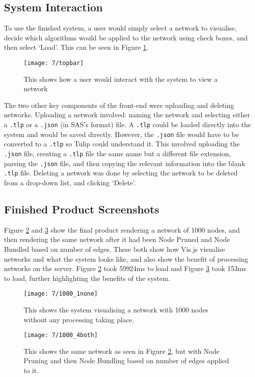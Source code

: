 \documentclass[../dissertation.tex]{subfiles}
\begin{document}
\subsection{System Interaction}

To use the finished system, a user would simply select a network to visualise, decide which algorithms would be applied to the network using check boxes, and then select `Load'. This can be seen in Figure \ref{fig:topbar}.

\begin{figure}[H]
    \centering
    \texttt{[image: 7/topbar]}
    \caption{This shows how a user would interact with the system to view a network}
    \label{fig:topbar}
\end{figure}

The two other key components of the front-end were uploading and deleting networks. Uploading a network involved: naming the network and selecting either a \texttt{.tlp} or a \texttt{.json} (in SAS's format) file. A \texttt{.tlp} could be loaded directly into the system and would be saved directly. However, the \texttt{.json} file would have to be converted to a \texttt{.tlp} so Tulip could understand it. This involved uploading the \texttt{.json} file, creating a \texttt{.tlp} file the same name but a different file extension, parsing the \texttt{.json} file, and then copying the relevant information into the blank \texttt{.tlp} file. Deleting a network was done by selecting the network to be deleted from a drop-down list, and clicking `Delete'.

\subsection{Finished Product Screenshots}

Figure \ref{fig:1000-none} and \ref{fig:1000-both} show the final product rendering a network of 1000 nodes, and then rendering the same network after it had been Node Pruned and Node Bundled based on number of edges. These both show how Vis.js visualise networks and what the system looks like, and also show the benefit of processing networks on the server. Figure \ref{fig:1000-none} took 59924ms to load and Figure \ref{fig:1000-both} took 153ms to load, further highlighting the benefits of the system.

\begin{figure}[H]
    \centering
    \texttt{[image: 7/1000\_1none]}
    \caption{This shows the system visualising a network with 1000 nodes without any processing taking place.}
    \label{fig:1000-none}
\end{figure}

\begin{figure}[H]
    \centering
    \texttt{[image: 7/1000\_4both]}
    \caption{This shows the same network as seen in Figure \ref{fig:1000-none}, but with Node Pruning and then Node Bundling based on number of edges applied to it.}
    \label{fig:1000-both}
\end{figure}
\end{document}
